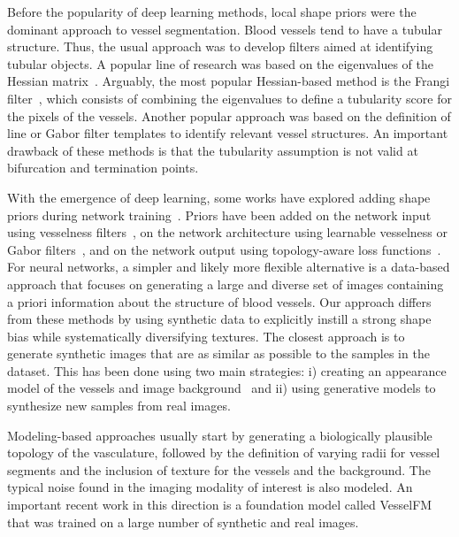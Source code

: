 \documentclass[%
reprint,
nofootinbib,
 amsmath,amssymb,
aps,
superscriptaddress,
showkeys,
longbibliography
]{revtex4-1}
\begin{document}
Before the popularity of deep learning methods, local shape priors were the dominant approach to vessel segmentation. Blood vessels tend to have a tubular structure. Thus, the usual approach was to develop filters aimed at identifying tubular objects. A popular line of research was based on the eigenvalues of the Hessian matrix~\cite{fraz2012blood,sato1998three}. Arguably, the most popular Hessian-based method is the Frangi filter~\cite{frangi1998multiscale}, which consists of combining the eigenvalues to define a tubularity score for the pixels of the vessels. Another popular approach was based on the definition of line or Gabor filter templates to identify relevant vessel structures. An important drawback of these methods is that the tubularity assumption is not valid at bifurcation and termination points.

With the emergence of deep learning, some works have explored adding shape priors during network training~\cite{bohlender2021survey}. Priors have been added on the network input using vesselness filters~\cite{affane2022robust,hu2024domain,garret2024deep}, on the network architecture using learnable vesselness or Gabor filters~\cite{chen2023learnable,fu2018frangi,volkov2025modification}, and on the network output using topology-aware loss functions~\cite{shit2021cldice,hu2019topology,berger2024topologically}. For neural networks, a simpler and likely more flexible alternative is a data-based approach that focuses on generating a large and diverse set of images containing a priori information about the structure of blood vessels. Our approach differs from these methods by using synthetic data to explicitly instill a strong shape bias while systematically diversifying textures. The closest approach is to generate synthetic images that are as similar as possible to the samples in the dataset. This has been done using two main strategies: i) creating an appearance model of the vessels and image background~\cite{tetteh2020deepvesselnet,wittmann2025vesselfm,wittmann2024simulation,mathys2025synthetic} and ii) using generative models to synthesize new samples from real images.

Modeling-based approaches usually start by generating a biologically plausible topology of the vasculature, followed by the definition of varying radii for vessel segments and the inclusion of texture for the vessels and the background. The typical noise found in the imaging modality of interest is also modeled. An important recent work in this direction is a foundation model called VesselFM~\cite{wittmann2025vesselfm} that was trained on a large number of synthetic and real images.
\end{document}
